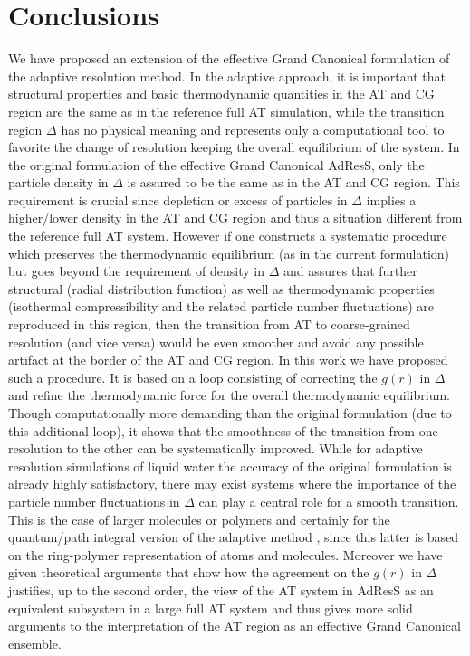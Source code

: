 \documentclass[aps,pre,preprint]{revtex4}
\begin{document}
\section{Conclusions}
We have proposed an extension of the effective Grand Canonical formulation of the adaptive resolution method. In the adaptive approach, it is important that structural properties and basic thermodynamic quantities in the AT and CG region are the same as in the reference full AT simulation, while the transition region $\Delta$ has no physical meaning and represents only a computational tool to favorite the change of resolution keeping the overall equilibrium of the system. In the original formulation of the effective Grand Canonical AdResS, only the particle density in $\Delta$ is assured to be the same as in the AT and CG region. This requirement is crucial since depletion or excess of particles in $\Delta$ implies a higher/lower density in the AT and CG region and thus a situation different from the reference full AT system.  However if one constructs a systematic procedure which preserves the thermodynamic equilibrium (as in the current formulation) but goes beyond the requirement of density in $\Delta$ and assures that further structural (radial distribution function) as well as thermodynamic properties (isothermal compressibility and the related particle number fluctuations) are reproduced in this region, then the transition from AT to coarse-grained resolution (and vice versa) would be even smoother and avoid any possible artifact at the border of the AT and CG region. In this work we have proposed such a procedure. It is based on a loop consisting of correcting the $g(r)$ in $\Delta$ and refine the thermodynamic force for the overall thermodynamic equilibrium. Though computationally more demanding than the original formulation (due to this additional loop), it shows that the smoothness of the transition from one resolution to the other can be systematically improved. While for adaptive resolution simulations of liquid water the accuracy of the original formulation is already highly satisfactory, there may exist systems where the importance of the particle number fluctuations in $\Delta$ can play a central role for a smooth transition. This is the case of larger molecules or polymers \cite{jstatphyskurt} and certainly for the quantum/path integral version of the adaptive method \cite{adolfo1,adolfo2,raffaello}, since this latter is based on the ring-polymer representation of atoms and molecules. Moreover we have given theoretical arguments that show how the agreement on the $g(r)$ in $\Delta$ justifies, up to the second order, the view of the AT system in AdResS as an equivalent subsystem in a large full AT system and thus gives more solid arguments to the interpretation of the AT region as an effective Grand Canonical ensemble. 
\end{document}
